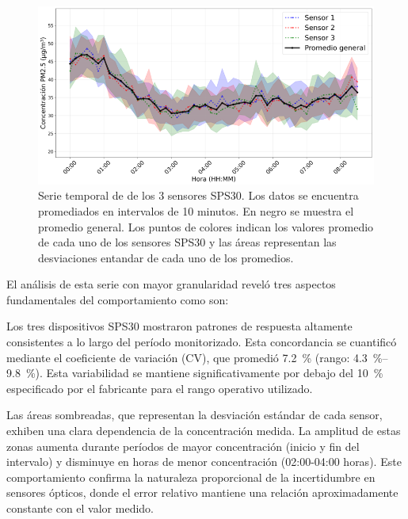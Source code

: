 \begin{figure}[!hp]
	\centering
	\includegraphics[width=1\linewidth]{Figures/SPS30_10_minutos}
	\caption{Serie temporal de  \MPF de los 3 sensores SPS30. Los datos se encuentra promediados en intervalos de 10 minutos. En negro se muestra el promedio general. Los puntos de colores indican los valores promedio de cada uno de los sensores SPS30 y las áreas representan las desviaciones entandar de cada uno de los promedios.}
	\label{fig:sps3010minutos}
\end{figure}


El análisis de esta serie con mayor granularidad reveló tres aspectos fundamentales del comportamiento como son:


Los tres dispositivos SPS30 mostraron patrones de respuesta altamente consistentes a lo largo del período monitorizado. Esta concordancia se cuantificó mediante el coeficiente de variación (CV), que promedió \SI{7.2}{\percent} (rango: \SIrange{4.3}{9.8}{\percent}). Esta variabilidad se mantiene significativamente por debajo del \SI{10}{\percent} especificado por el fabricante para el rango operativo utilizado.

Las áreas sombreadas, que representan la desviación estándar de cada sensor, exhiben una clara dependencia de la concentración medida. La amplitud de estas zonas aumenta durante períodos de mayor concentración (inicio y fin del intervalo) y disminuye en horas de menor concentración (02:00-04:00 horas). Este comportamiento confirma la naturaleza proporcional de la incertidumbre en sensores ópticos, donde el error relativo mantiene una relación aproximadamente constante con el valor medido.


